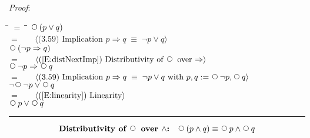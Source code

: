 \documentclass[12pt, fleqn, leqno]{article}
\newcommand{\lgap}{2pt}                             %
\newcommand{\mymathindent}{24pt}                    %
\newcommand{\equivs}{\ensuremath{\;\equiv\;}}       %
\newcommand{\impl}{\ensuremath{\Rightarrow}}        %
\newcommand{\Next}{\;\,\text{\raisebox{3.5pt}{\circle{6}}}}
\newcommand{\myqed}{\rule[-.23ex]{1.2ex}{2.0ex}}
\newcommand{\myqedtab}{\hspace{384pt}}              %
\newcommand{\Gll} {\langle}                         %
\newcommand{\Ggg} {\rangle}                         %
\newcommand{\Hint}[1]     {\ \ \ $\Gll              \mbox{#1} \Ggg$ }   %
\begin{document}
\emph{Proof}:
\begin{tabbing}
\hspace{\mymathindent} \= $= \;$ \= \myqedtab \= \kill
	\> \>   $\Next(p \lor q)$\\[\lgap]
	\> $=$  \>  \Hint{(3.59) Implication $p\impl q \equivs \neg p \lor q$}\\[\lgap]
	\> \>   $\Next(\neg p \impl q)$\\[\lgap]
	\> $=$  \>  \Hint{(\ref{E:distNextImp}) Distributivity of $\Next$ over $\impl$}\\[\lgap]
	\> \>   $\Next\neg p \impl \Next q$\\[\lgap]
	\> $=$  \>  \Hint{(3.59) Implication $p\impl q \equivs \neg p \lor q$ with $p,q := \Next\neg p, \Next q$}\\[\lgap]
	\> \>   $\neg\Next\neg p \lor \Next q$\\[\lgap]
	\> $=$  \>  \Hint{(\ref{E:linearity}) Linearity}\\[\lgap]
	\> \>   $\Next p \lor \Next q$ \quad \myqed
\end{tabbing}
\begin{equation}\label{E:distNextAnd}
\textbf{Distributivity of $\Next$ over $\land$:}\quad \Next (p \land q) \equiv \Next p \land \Next q
\end{equation}
\end{document}
